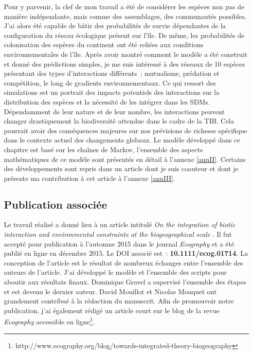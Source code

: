 Pour y parvenir, la clef de mon travail a été de considérer les espèces non pas
de manière indépendante, mais comme des assemblages, des communautés possibles.
J'ai alors été capable de bâtir des probabilités de survie dépendantes de la
configuration du réseau écologique présent sur l'île. De même, les probabilités
de colonisation des espèces du continent ont été reliées aux conditions
environnementales de l'île. Après avoir montré comment le modèle a été
construit et donné des prédictions simples, je me suis intéressé à des réseaux
de 10 espèces présentant des types d'interactions différents~: mutualisme,
prédation et compétition, le long de gradients environnementaux. Ce qui ressort
des simulations est un portrait des impacts potentiels des interactions sur
la distribution des espèces et la nécessité de les intégrer dans les SDMs.
Dépendamment de leur nature et de leur nombre, les interactions peuvent changer
drastiquement la biodiversité attendue dans le cadre de la TIB.
Cela pourrait avoir des conséquences majeures sur nos prévisions de richesse
spécifique dans le contexte actuel des changements globaux. Le modèle développé
dans ce chapitre est basé sur les chaînes de Markov, l'ensemble des aspects
mathématiques de ce modèle sont présentés en détail à l'annexe \ref{annII}.
Certains des développements sont repris dans un article dont je suis coauteur
et dont je présente ma contribution à cet article à l'annexe \ref{annIII}.



\subsection{Publication associée}

Le travail réalisé a donné lieu à un article intitulé \emph{On the integration
of biotic interaction and environmental constraints at the biogeographical scale}
\citep{Cazelles2016a}. Il fut accepté pour publication à l'automne 2015 dans le
journal \emph{Ecography} et a été publié en ligne en décembre 2015. Le DOI
associé est~: \textbf{10.1111/ecog.01714}. La conception de l'article est le
résultat de nombreux échanges entre l'ensemble des auteurs de l'article.
J'ai développé le modèle et l'ensemble des scripts pour aboutir aux résultats
finaux. Dominique Gravel a supervisé l'ensemble des étapes et est devenu le
dernier auteur. David Mouillot et Nicolas Mouquet ont grandement contribué à la
rédaction du manuscrit. Afin de promouvoir notre publication, j'ai également
rédigé un article court sur le blog de la revue \emph{Ecography} accessible en
ligne\footnote{http://www.ecography.org/blog/towards-integrated-theory-biogeography}.



